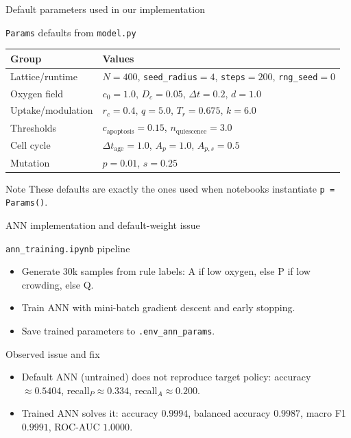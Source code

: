 \documentclass[10pt,aspectratio=169]{beamer}
\begin{document}
\begin{frame}[c]{Default parameters used in our implementation}
\tiny
\begin{block}{\texttt{Params} defaults from \texttt{model.py}}
\centering
\begin{tabular}{>{\raggedright\arraybackslash}p{}>{\raggedright\arraybackslash}p{}}
\toprule
Group & Values \\
\midrule
Lattice/runtime & $N=400$, \texttt{seed\_radius}$=4$, \texttt{steps}$=200$, \texttt{rng\_seed}$=0$ \\
Oxygen field & $c_0=1.0$, $D_c=0.05$, $\Delta t=0.2$, $d=1.0$ \\
Uptake/modulation & $r_c=0.4$, $q=5.0$, $T_r=0.675$, $k=6.0$ \\
Thresholds & $c_{\text{apoptosis}}=0.15$, $n_{\text{quiescence}}=3.0$ \\
Cell cycle & $\Delta t_{\text{age}}=1.0$, $A_p=1.0$, $A_{p,s}=0.5$ \\
Mutation & $p=0.01$, $s=0.25$ \\
\bottomrule
\end{tabular}
\end{block}

\begin{alertblock}{Note}
These defaults are exactly the ones used when notebooks instantiate \texttt{p = Params()}.
\end{alertblock}
\end{frame}

\begin{frame}[c]{ANN implementation and default-weight issue}
\small
\begin{block}{\texttt{ann\_training.ipynb} pipeline}
\begin{itemize}
  \item Generate 30k samples from rule labels: A if low oxygen, else P if low crowding, else Q.
  \item Train ANN with mini-batch gradient descent and early stopping.
  \item Save trained parameters to \texttt{.env\_ann\_params}.
\end{itemize}
\end{block}

\begin{block}{Observed issue and fix}
\begin{itemize}
  \item Default ANN (untrained) does not reproduce target policy:
  accuracy $\approx 0.5404$, recall$_P\approx 0.334$, recall$_A\approx 0.200$.
  \item Trained ANN solves it:
  accuracy $0.9994$, balanced accuracy $0.9987$, macro F1 $0.9991$, ROC-AUC $1.0000$.
\end{itemize}
\end{block}
\end{frame}
\end{document}
